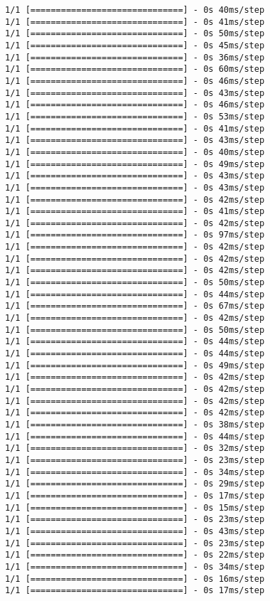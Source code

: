 \documentclass[11pt]{article}
\begin{document}
\begin{Verbatim}[commandchars=\\\{\}]
1/1 [==============================] - 0s 40ms/step
1/1 [==============================] - 0s 41ms/step
1/1 [==============================] - 0s 50ms/step
1/1 [==============================] - 0s 45ms/step
1/1 [==============================] - 0s 36ms/step
1/1 [==============================] - 0s 60ms/step
1/1 [==============================] - 0s 46ms/step
1/1 [==============================] - 0s 43ms/step
1/1 [==============================] - 0s 46ms/step
1/1 [==============================] - 0s 53ms/step
1/1 [==============================] - 0s 41ms/step
1/1 [==============================] - 0s 43ms/step
1/1 [==============================] - 0s 40ms/step
1/1 [==============================] - 0s 49ms/step
1/1 [==============================] - 0s 43ms/step
1/1 [==============================] - 0s 43ms/step
1/1 [==============================] - 0s 42ms/step
1/1 [==============================] - 0s 41ms/step
1/1 [==============================] - 0s 42ms/step
1/1 [==============================] - 0s 97ms/step
1/1 [==============================] - 0s 42ms/step
1/1 [==============================] - 0s 42ms/step
1/1 [==============================] - 0s 42ms/step
1/1 [==============================] - 0s 50ms/step
1/1 [==============================] - 0s 44ms/step
1/1 [==============================] - 0s 67ms/step
1/1 [==============================] - 0s 42ms/step
1/1 [==============================] - 0s 50ms/step
1/1 [==============================] - 0s 44ms/step
1/1 [==============================] - 0s 44ms/step
1/1 [==============================] - 0s 49ms/step
1/1 [==============================] - 0s 42ms/step
1/1 [==============================] - 0s 42ms/step
1/1 [==============================] - 0s 42ms/step
1/1 [==============================] - 0s 42ms/step
1/1 [==============================] - 0s 38ms/step
1/1 [==============================] - 0s 44ms/step
1/1 [==============================] - 0s 32ms/step
1/1 [==============================] - 0s 23ms/step
1/1 [==============================] - 0s 34ms/step
1/1 [==============================] - 0s 29ms/step
1/1 [==============================] - 0s 17ms/step
1/1 [==============================] - 0s 15ms/step
1/1 [==============================] - 0s 23ms/step
1/1 [==============================] - 0s 43ms/step
1/1 [==============================] - 0s 23ms/step
1/1 [==============================] - 0s 22ms/step
1/1 [==============================] - 0s 34ms/step
1/1 [==============================] - 0s 16ms/step
1/1 [==============================] - 0s 17ms/step

\end{Verbatim}
\end{document}
